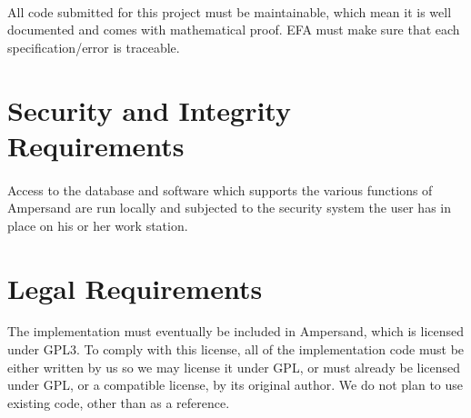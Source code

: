 \paragraph*{}
All code submitted for this project must be maintainable, which mean it is well 
documented and comes with mathematical proof. EFA must make sure that each 
specification/error is traceable.
  

\section{Security and Integrity Requirements}\label{sec:Security}
\paragraph*{}
 Access to the database and software which 
supports the various functions of Ampersand are run locally and subjected to the security system 
the user has in place on his or her work station.

	

\section{Legal Requirements}\label{sec:Legal}
The implementation must eventually be included in Ampersand, which is licensed
under GPL3. To comply with this license, all of the implementation code must be
either written by us so we may license it under GPL, or must already be licensed
under GPL, or a compatible license, by its original author. We do not plan to
use existing code, other than as a reference.
